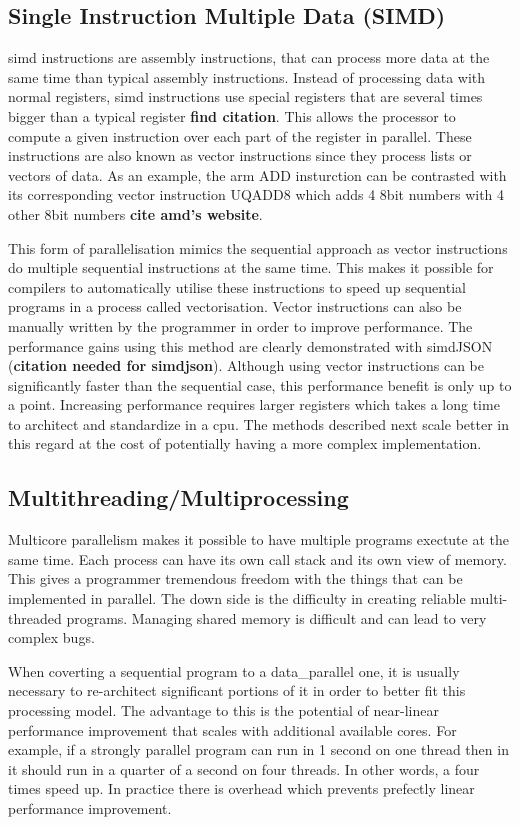 \subsection{Single Instruction Multiple Data (SIMD)}
\ac{simd} instructions are assembly instructions, that can process more data
at the same time than typical assembly instructions. Instead of processing data
with normal registers, \ac{simd} instructions use special registers that are
several times bigger than a typical register \textbf{find citation}. This allows
the processor to compute a given instruction over each part of the register in
parallel. These instructions are also known as vector instructions since they
process lists or vectors of data. As an example, the arm ADD insturction can be
contrasted with its corresponding vector instruction UQADD8 which adds 4 8bit
numbers with 4 other 8bit numbers \textbf{cite amd's website}.

This form of parallelisation mimics the sequential approach as vector
instructions do multiple sequential instructions at the same time. This makes
it possible for compilers to automatically utilise these instructions to speed
up sequential programs in a process called vectorisation. Vector instructions
can also be manually written by the programmer in order to improve performance.
The performance gains using this method are clearly demonstrated with simdJSON
(\textbf{citation needed for simdjson}). Although using vector instructions can
be significantly faster than the sequential case, this performance benefit is
only up to a point. Increasing performance requires larger registers which takes
a long time to architect and standardize in a \ac{cpu}. The methods described
next scale better in this regard at the cost of potentially having a more
complex implementation.

\subsection{Multithreading/Multiprocessing}
Multicore parallelism makes it possible to have multiple programs exectute at
the same time. Each process can have its own call stack and its own view of
memory. This gives a programmer tremendous freedom with the things that can be
implemented in parallel. The down side is the difficulty in creating reliable
multi-threaded programs. Managing shared memory is difficult and can lead to
very complex bugs.

When coverting a sequential program to a \gls{data_parallel} one, it is usually
necessary to re-architect significant portions of it in order to better fit
this processing model. The advantage to this is the potential of near-linear
performance improvement that scales with additional available cores. For
example, if a strongly parallel program can run in 1 second on one thread then
in it should run in a quarter of a second on four threads. In other words, a
four times speed up. In practice there is overhead which prevents prefectly
linear performance improvement.


